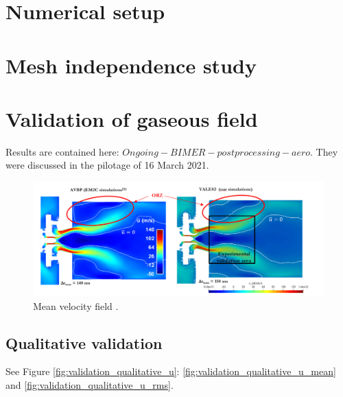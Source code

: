 \section{Numerical setup}

\section{Mesh independence study}

\section{Validation of gaseous field}

Results are contained here: $Ongoing - BIMER - postprocessing - aero$. They were discussed in the pilotage of 16 March 2021.


\begin{figure}[h!]
	\centering
	\includegraphics[scale=0.7]{./part3_applications/figures_ch7_aero/quantitative_view_mean_velocity_field}
	\caption{Mean velocity field .}
	\label{fig:quantitative_view_mean_velocity_field}
\end{figure}


\subsection{Qualitative validation}


See Figure \ref{fig:validation_qualitative_u}: \ref{fig:validation_qualitative_u_mean} and \ref{fig:validation_qualitative_u_rms}.


